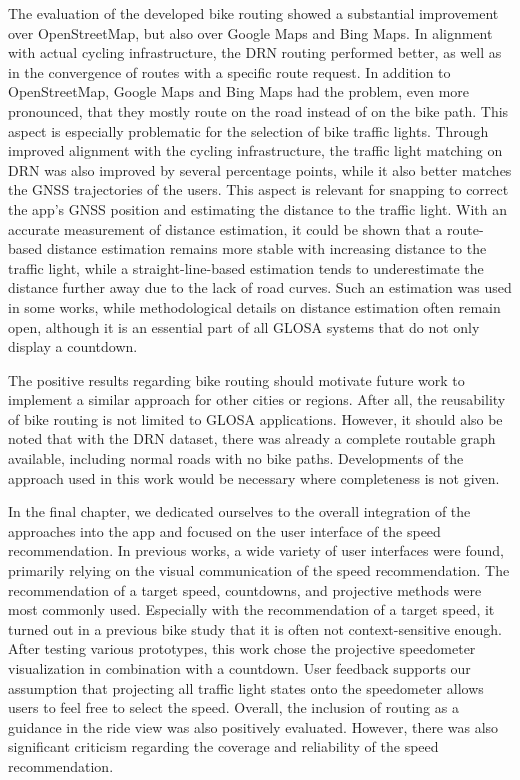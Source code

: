 The evaluation of the developed bike routing showed a substantial improvement over OpenStreetMap, but also over Google Maps and Bing Maps. In alignment with actual cycling infrastructure, the DRN routing performed better, as well as in the convergence of routes with a specific route request. In addition to OpenStreetMap, Google Maps and Bing Maps had the problem, even more pronounced, that they mostly route on the road instead of on the bike path. This aspect is especially problematic for the selection of bike traffic lights. Through improved alignment with the cycling infrastructure, the traffic light matching on DRN was also improved by several percentage points, while it also better matches the GNSS trajectories of the users. This aspect is relevant for snapping to correct the app's GNSS position and estimating the distance to the traffic light. With an accurate measurement of distance estimation, it could be shown that a route-based distance estimation remains more stable with increasing distance to the traffic light, while a straight-line-based estimation tends to underestimate the distance further away due to the lack of road curves. Such an estimation was used in some works, while methodological details on distance estimation often remain open, although it is an essential part of all GLOSA systems that do not only display a countdown.

The positive results regarding bike routing should motivate future work to implement a similar approach for other cities or regions. After all, the reusability of bike routing is not limited to GLOSA applications. However, it should also be noted that with the DRN dataset, there was already a complete routable graph available, including normal roads with no bike paths. Developments of the approach used in this work would be necessary where completeness is not given.

In the final chapter, we dedicated ourselves to the overall integration of the approaches into the app and focused on the user interface of the speed recommendation. In previous works, a wide variety of user interfaces were found, primarily relying on the visual communication of the speed recommendation. The recommendation of a target speed, countdowns, and projective methods were most commonly used. Especially with the recommendation of a target speed, it turned out in a previous bike study that it is often not context-sensitive enough. After testing various prototypes, this work chose the projective speedometer visualization in combination with a countdown. User feedback supports our assumption that projecting all traffic light states onto the speedometer allows users to feel free to select the speed. Overall, the inclusion of routing as a guidance in the ride view was also positively evaluated. However, there was also significant criticism regarding the coverage and reliability of the speed recommendation.

